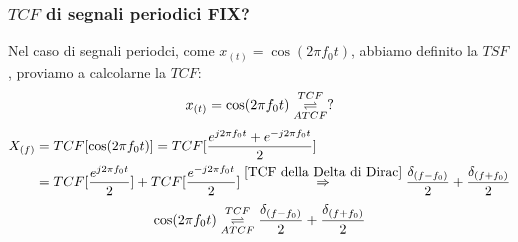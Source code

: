         \subsubsection{$TCF$ di segnali periodici FIX?}\label{TCF di segnali periodici}
                Nel caso di segnali periodci, come $x_{(t)} = \cos(2\pi f_0t)$, abbiamo definito la $TSF$, proviamo a calcolarne la $TCF$:
                \[
                    x_{(t)} = \cos(2\pi f_0t) \overunderset{TCF}{ATCF}{\rightleftharpoons} ?
                \] 
                \begin{align}
                    X_{(f)} &= TCF[\cos(2\pi f_0t)] = TCF[\frac{e^{j2\pi f_0t}+ e^{-j2\pi f_0t}}{2}] \nonumber \\
                            &= TCF[\frac{e^{j2\pi f_0t}}{2}] + TCF[\frac{e^{-j2\pi f_0t}}{2}] \overset{\ref{TCF della Delta di Dirac}}{\Rightarrow}  \frac{\delta_{(f-f_0)}}{2} +\frac{\delta_{(f+f_0)}}{2} \nonumber
                \end{align}
                \[
                    \cos(2\pi f_0t) \overunderset{TCF}{ATCF}{\rightleftharpoons} \frac{\delta_{(f-f_0)}}{2} +\frac{\delta_{(f+f_0)}}{2}
                \]\label{TCF di un coseno}

